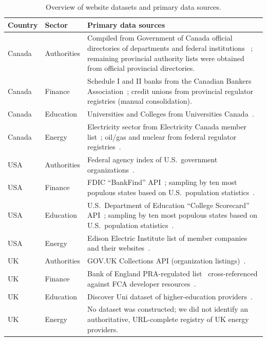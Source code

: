 \documentclass[conference]{IEEEtran}
\begin{document}
\begin{table}[t]
 \caption{Overview of website datasets and primary data sources.}
 \label{tab:dataset_sources}
 \centering
 \scriptsize
 \setlength{\tabcolsep}{3pt}
 \renewcommand{\arraystretch}{1.15}
 \begin{tabularx}{\columnwidth}{l l X}
 \toprule
 Country & Sector & Primary data sources \\
 \midrule
 Canada & Authorities &
 Compiled from Government of Canada official directories of departments and federal institutions
~\cite{canada_depts,canada_institutions}; remaining provincial authority lists were obtained from
 official provincial directories. \\
 Canada & Finance &
 Schedule I and II banks from the Canadian Bankers Association~\cite{cba_member_banks_2024};
 credit unions from provincial regulator registries (manual consolidation). \\
 Canada & Education &
 Universities and Colleges from Universities Canada~\cite{ca_unis_list}. \\
 Canada & Energy &
 Electricity sector from Electricity Canada member list~\cite{electric_canada_members};
 oil/gas and nuclear from federal regulator registries~\cite{cer_pipeline_companies,cnsc_nuclear_facilities}. \\
 \addlinespace[0.4em]
 USA & Authorities &
 Federal agency index of U.S.\ government organizations~\cite{usa-agency-index}. \\
 USA & Finance &
 FDIC ``BankFind'' API~\cite{fdic-bankfind-api}; sampling by ten most populous states based on
 U.S.\ population statistics~\cite{us-population-stats}. \\
 USA & Education &
 U.S.\ Department of Education ``College Scorecard'' API~\cite{us-college-scorecard-docs};
 sampling by ten most populous states based on U.S.\ population statistics~\cite{us-population-stats}. \\
 USA & Energy &
 Edison Electric Institute list of member companies and their websites~\cite{edison-electric-member-sites}. \\
 \addlinespace[0.4em]
 UK & Authorities &
 GOV.UK Collections API (organization listings)~\cite{uk-gov-collections-api-docs}. \\
 UK & Finance &
 Bank of England PRA-regulated list~\cite{uk-pra-creditunions-list} cross-referenced against
 FCA developer resources~\cite{uk-fca-api-docs}. \\
 UK & Education &
 Discover Uni dataset of higher-education providers~\cite{hesa_discoveruni_2024}. \\
 UK & Energy &
 No dataset was constructed; we did not identify an authoritative, URL-complete registry of UK energy providers. \\
 \bottomrule
 \end{tabularx}
\end{table}
\end{document}
